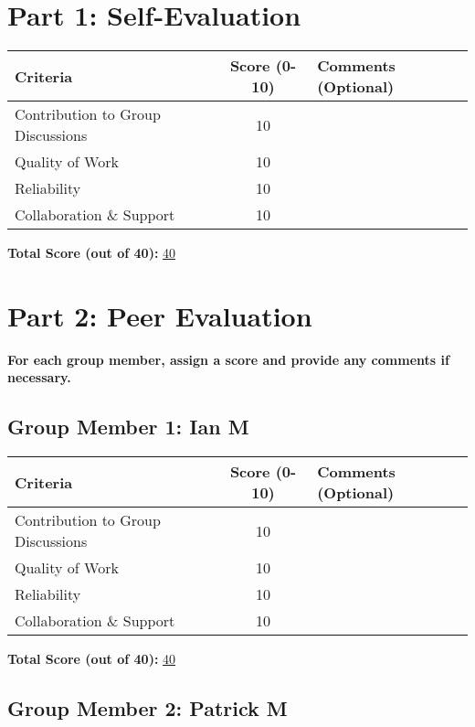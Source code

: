 \documentclass{article}
\begin{document}
\section*{Part 1: Self-Evaluation}

\begin{tabular}{|l|c|p{7cm}|}
\hline
\textbf{Criteria} & \textbf{Score (0-10)} & \textbf{Comments (Optional)} \\ \hline
Contribution to Group Discussions & 10 & \\ \hline
Quality of Work & 10 & \\ \hline
Reliability & 10 & \\ \hline
Collaboration \& Support & 10 & \\ \hline
\end{tabular}

\vspace{0.5cm}
\textbf{Total Score (out of 40):} \underline{\hspace{1cm} 40 \hspace{1cm}}

\section*{Part 2: Peer Evaluation}

\textbf{For each group member, assign a score and provide any comments if necessary.}

\subsection*{Group Member 1: Ian M}

\begin{tabular}{|l|c|p{7cm}|}
\hline
\textbf{Criteria} & \textbf{Score (0-10)} & \textbf{Comments (Optional)} \\ \hline
Contribution to Group Discussions & 10 & \\ \hline
Quality of Work & 10 &\\ \hline
Reliability & 10 & \\ \hline
Collaboration \& Support & 10 & \\ \hline
\end{tabular}

\vspace{0.5cm}
\textbf{Total Score (out of 40):} \underline{\hspace{1cm} 40 \hspace{1cm}}

\subsection*{Group Member 2: Patrick M}
\end{document}
